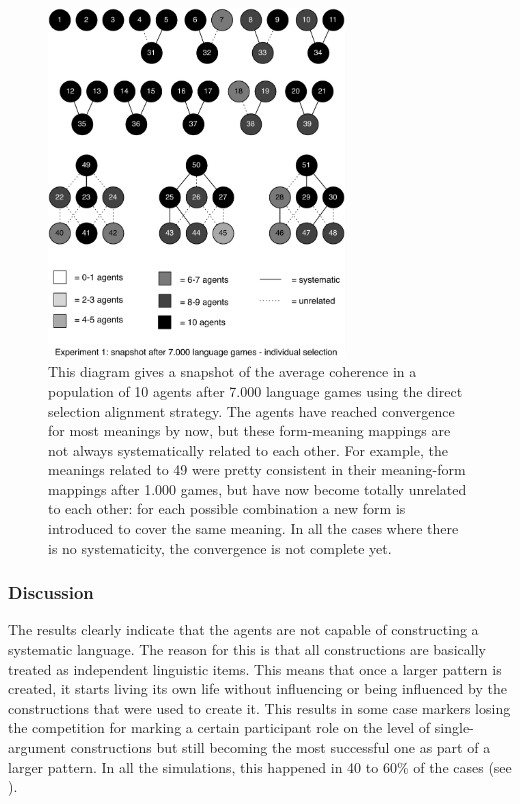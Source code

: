 \begin{figure}[p]
\centerline{\includegraphics[width=0.7\textwidth]{Chapter4/figs/direct-coherence-no-analogy-7000}}
  \caption[Experiment 1: snapshot after 7.000 games]{This diagram gives a snapshot of the average coherence in a population of 10 agents after 7.000 language games using the direct selection alignment strategy. The agents have reached convergence for most meanings by now, but these form-meaning mappings are not always systematically related to each other. For example, the meanings related to 49 were pretty consistent in their meaning-form mappings after 1.000 games, but have now become totally unrelated to each other: for each possible combination a new form is introduced to cover the same meaning. In all the cases where there is no systematicity, the convergence is not complete yet.}
   \label{f:1-coherence-7000}
\end{figure}


\subsubsection{Discussion}
 The results clearly indicate that the agents are not capable of constructing a systematic language. The reason for this is that all constructions are basically treated as independent linguistic items. This means that once a larger pattern is created, it starts living its own life without influencing or being influenced by the constructions that were used to create it. This results in some case markers losing the competition for marking a certain participant role on the level of single-argument constructions but still becoming the most successful one as part of a larger pattern. In all the simulations, this happened in 40 to 60\% of the cases (see ).

